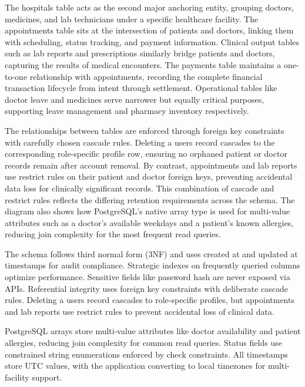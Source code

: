 \justifying
\noindent The hospitals table acts as the second major anchoring entity, grouping doctors, medicines, and lab technicians under a specific healthcare facility. The appointments table sits at the intersection of patients and doctors, linking them with scheduling, status tracking, and payment information. Clinical output tables such as lab reports and prescriptions similarly bridge patients and doctors, capturing the results of medical encounters. The payments table maintains a one-to-one relationship with appointments, recording the complete financial transaction lifecycle from intent through settlement. Operational tables like doctor leave and medicines serve narrower but equally critical purposes, supporting leave management and pharmacy inventory respectively.

\justifying
\noindent The relationships between tables are enforced through foreign key constraints with carefully chosen cascade rules. Deleting a users record cascades to the corresponding role-specific profile row, ensuring no orphaned patient or doctor records remain after account removal. By contrast, appointments and lab reports use restrict rules on their patient and doctor foreign keys, preventing accidental data loss for clinically significant records. This combination of cascade and restrict rules reflects the differing retention requirements across the schema. The diagram also shows how PostgreSQL's native array type is used for multi-value attributes such as a doctor's available weekdays and a patient's known allergies, reducing join complexity for the most frequent read queries.

\justifying
\noindent The schema follows third normal form (3NF) and uses created at and updated at timestamps for audit compliance. Strategic indexes on frequently queried columns optimize performance. Sensitive fields like password hash are never exposed via APIs. Referential integrity uses foreign key constraints with deliberate cascade rules. Deleting a users record cascades to role-specific profiles, but appointments and lab reports use restrict rules to prevent accidental loss of clinical data.

\justifying
\noindent PostgreSQL arrays store multi-value attributes like doctor availability and patient allergies, reducing join complexity for common read queries. Status fields use constrained string enumerations enforced by check constraints. All timestamps store UTC values, with the application converting to local timezones for multi-facility support.

